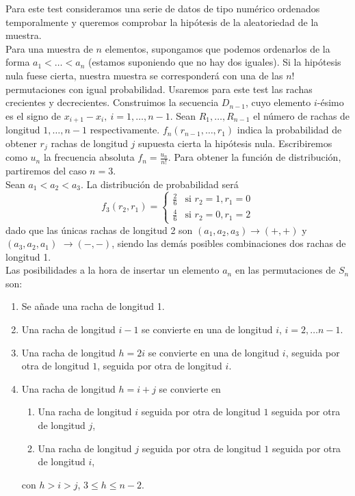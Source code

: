 	Para este test consideramos una serie de datos de tipo 
numérico ordenados temporalmente y queremos comprobar la 
hipótesis de la aleatoriedad de la muestra.\\
	Para una muestra de $n$ elementos, supongamos que podemos 
ordenarlos de la forma $a_1 < \dots < a_n$ (estamos 
suponiendo que no hay dos iguales). Si la hipótesis nula fuese 
cierta, nuestra muestra se corresponderá con una de las $n!$ 
permutaciones con igual probabilidad. Usaremos para este test 
las rachas crecientes y decrecientes. Construimos la 
secuencia $D_{n-1}$, cuyo elemento $i$-ésimo es el signo de 
$x_{i+1} - x_i,\ i=1, \dots, n-1$. Sean $R_1, \dots, R_{n-1}$ 
el número de rachas de longitud $1, \dots, n-1$ 
respectivamente. $f_n(r_{n-1}, \dots, r_1)$ indica la 
probabilidad de obtener $r_j$ rachas de longitud $j$ supuesta 
cierta la hipótesis nula. Escribiremos como $u_n$ la 
frecuencia absoluta $f_n = \frac{u_n}{n!}$. Para obtener la 
función de distribución, partiremos del caso $n=3$.\\
	Sean $a_1 < a_2 < a_3$. La distribución de probabilidad 
será 
	\[ 
	f_3(r_2, r_1) = 
		\left\lbrace\begin{array}{cc}
			\frac{2}{6} & \text{si } r_2 = 1, r_1 = 0 \\
			\frac{4}{6} & \text{si } r_2 = 0, r_1 = 2 
		\end{array}\right.
	\]
	dado que las únicas rachas de longitud 2 son 
$(a_1, a_2, a_3) \rightarrow (+,+)$ y $(a_3, a_2, a_1)$ 
$\rightarrow (-,-)$, siendo las demás posibles combinaciones 
dos rachas de longitud 1.\\
	Las posibilidades a la hora de insertar un elemento $a_n$ 
en las permutaciones de $S_n$ son:
\begin{enumerate}
	\item Se añade una racha de longitud 1.
	\item Una racha de longitud $i-1$ se convierte en una 
		de longitud $i$, $i=2,\dots n-1$.
	\item Una racha de longitud $h=2i$ se convierte en una de 
		longitud $i$, seguida por otra de longitud $1$, 
		seguida por otra de longitud $i$.
	\item Una racha de longitud $h=i+j$ se convierte en
	\begin{enumerate}
		\item Una racha de longitud $i$ seguida por otra de 	
			longitud $1$ seguida por otra de longitud $j$,
		\item Una racha de longitud $j$ seguida por otra de 	
			longitud $1$ seguida por otra de longitud $i$,
	\end{enumerate}
		con $h>i>j$, $3 \leq h \leq n-2$.
\end{enumerate}

